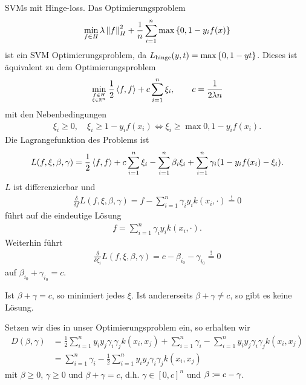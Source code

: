 \begin{bsp*}
SVMs mit Hinge-loss. Das Optimierungsproblem
\begin{align*}
\min_{f\in H} \lambda\left\|f\right\|_H^2 + \frac{1}{n}\sum_{i=1}^n \max\left\{ 0,1-y_i
f(x) \right\}
\end{align*}
ist ein SVM Optimierungsproblem, da $L_\text{hinge}(y,t) = \max\left\{ 0,1-yt \right\}$.
Dieses ist äquivalent zu dem Optimierungsproblem
\begin{align*}
\min_{\atop{f\in H}{\xi\in\R^n}} \frac{1}{2}\lin{f,f} + c\sum_{i=1}^{n}
\xi_i,\qquad c= \frac{1}{2\lambda n}
\end{align*}
mit den Nebenbedingungen
\begin{align*}
\xi_i \ge 0,\quad \xi_i \ge 1-y_if(x_i)
\Leftrightarrow
\xi_i \ge \max{0,1-y_if(x_i)}.
\end{align*}
Die Lagrangefunktion des Problems ist
\begin{align*}
L(f,\xi,\beta,\gamma) = \frac{1}{2}\left\langle f,f\right\rangle + c\sum_{i=1}^n \xi_i -
\sum_{i=1}^n \beta_i \xi_i  + \sum_{i=1}^n \gamma_i(1-y_if(x_i)-\xi_i).
\end{align*}
$L$ ist differenzierbar und
\begin{align*}
\frac{\delta}{\delta f} L(f,\xi,\beta, \gamma)
= f - \sum_{i=1}^n \gamma_i y_i k(x_i,\cdot)
\overset{!}{=} 0
\end{align*}
führt auf die eindeutige Lösung
\begin{align*}
f = \sum_{i=1}^n \gamma_iy_i k(x_i,\cdot).
\end{align*}
Weiterhin führt
\begin{align*}
\frac{\delta}{\delta \xi_i} L(f,\xi,\beta,\gamma) = c-\beta_{i_0} - \gamma_{i_0}
\overset{!}{=} 0
\end{align*}
auf $\beta_{i_0} + \gamma_{i_0} = c$.

Ist $\beta + \gamma = c$, so minimiert jedes $\xi$. Ist andererseits
$\beta+\gamma\neq c$, so gibt es keine Lösung.

Setzen wir dies in unser Optimierungsproblem ein, so erhalten wir
\begin{align*}
D(\beta,\gamma) &= \frac{1}{2}\sum_{i=1}^n y_i y_j \gamma_i \gamma_j k(x_i,x_j)
+ \sum_{i=1}^n \gamma_i
- \sum_{i=1}^n y_i y_j \gamma_i \gamma_j k(x_i,x_j)\\
&= \sum_{i=1}^n \gamma_i
- \frac{1}{2}\sum_{i=1}^n y_i y_j \gamma_i \gamma_j k(x_i,x_j)
\end{align*}
mit $\beta\ge 0$, $\gamma\ge 0$ und $\beta + \gamma = c$, d.h.
$\gamma\in[0,c]^n$ und $\beta \coloneq c-\gamma$.


\end{bsp*}
